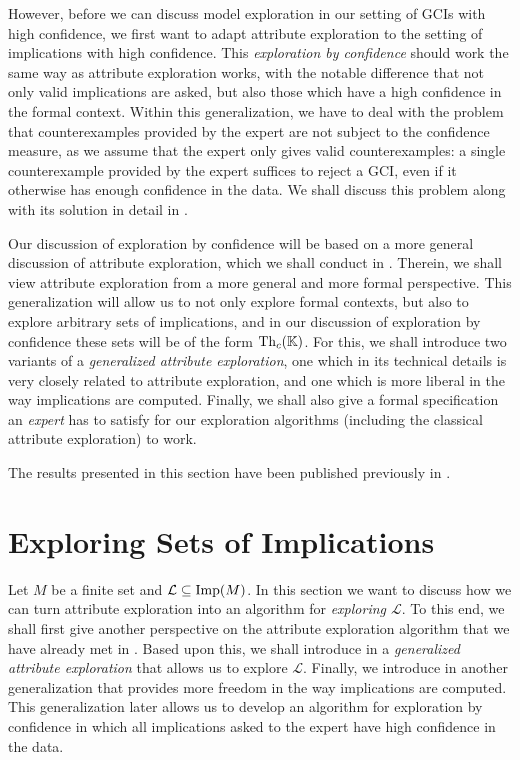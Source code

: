 However, before we can discuss model exploration in our setting of GCIs with high
confidence, we first want to adapt attribute exploration to the setting of implications
with high confidence.  This \emph{exploration by confidence} should work the same way as
attribute exploration works, with the notable difference that not only valid implications
are asked, but also those which have a high confidence in the formal context.  Within this
generalization, we have to deal with the problem that counterexamples provided by the
expert are not subject to the confidence measure, as we assume that the expert only gives
valid counterexamples: a single counterexample provided by the expert suffices to reject a
GCI, even if it otherwise has enough confidence in the data.  We shall discuss this
problem along with its solution in detail in .

Our discussion of exploration by confidence will be based on a more general discussion of
attribute exploration, which we shall conduct in .  Therein, we
shall view attribute exploration from a more general and more formal perspective.  This
generalization will allow us to not only explore formal contexts, but also to explore
arbitrary sets of implications, and in our discussion of exploration by confidence these
sets will be of the form $\operatorname{Th}_c({\mathbb{K}})$.  For this, we shall introduce two variants of a
\emph{generalized attribute exploration}, one which in its technical details is very
closely related to attribute exploration, and one which is more liberal in the way
implications are computed.  Finally, we shall also give a formal specification an
\emph{expert} has to satisfy for our exploration algorithms (including the classical
attribute exploration) to work.

The results presented in this section have been published previously in
\cite{Borch-LTCS-13-04}.

\section{Exploring Sets of Implications}
\label{sec:an-abstract-view}

Let $M$ be a finite set and $\mathcal{L} \subseteq \operatorname{Imp}(M)$.  In this section we want to
discuss how we can turn attribute exploration into an algorithm for \emph{exploring
  $\mathcal{L}$}.  To this end, we shall first give another perspective on the attribute
exploration algorithm that we have already met in .  Based upon this,
we shall introduce in  a \emph{generalized attribute
  exploration} that allows us to explore $\mathcal{L}$.  Finally, we introduce in
 another generalization that provides more freedom in the way
implications are computed.  This generalization later allows us to develop an algorithm
for exploration by confidence in which all implications asked to the expert have high
confidence in the data.

